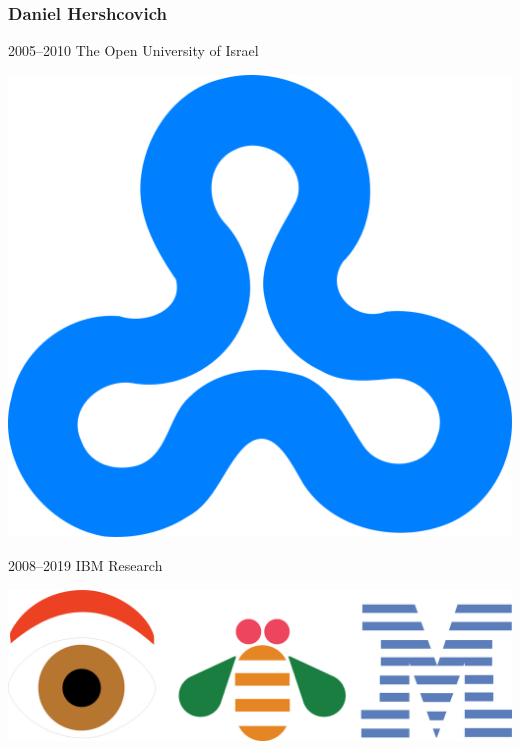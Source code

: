 \documentclass[t,xcolor={svgnames,table}]{beamer}
\begin{document}
\begin{frame}
\frametitle{Daniel Hershcovich}
\begin{minipage}{.7\textwidth}
2005--2010 The Open University of Israel
\end{minipage}
\begin{minipage}{.1\textwidth}
\includegraphics[width=\textwidth]{Open_university_israel_logo.png}
\end{minipage}

\vfill

\begin{minipage}{.7\textwidth}
2008--2019 IBM Research
\end{minipage}
\begin{minipage}{.125\textwidth}
\includegraphics[width=\textwidth]{eye_bee_m.png}
\end{minipage}

\vfill


\end{frame}
\end{document}
